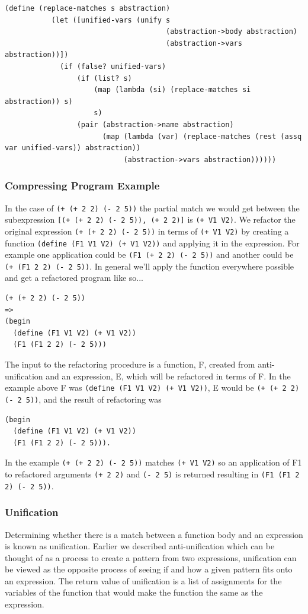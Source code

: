 \documentclass[a4paper,10pt]{article}
\begin{document}
\begin{lstlisting}[frame=trBL]
(define (replace-matches s abstraction)
           (let ([unified-vars (unify s
                                      (abstraction->body abstraction)
                                      (abstraction->vars abstraction))])
             (if (false? unified-vars)
                 (if (list? s)
                     (map (lambda (si) (replace-matches si abstraction)) s)
                     s)
                 (pair (abstraction->name abstraction)
                       (map (lambda (var) (replace-matches (rest (assq var unified-vars)) abstraction))
                            (abstraction->vars abstraction))))))
\end{lstlisting}
\subsubsection{Compressing Program Example}
In the case of \texttt{(+ (+ 2 2) (- 2 5))} the partial match we would get between the subexpression \texttt{[(+ (+ 2 2) (- 2 5)), (+ 2 2)]} is \texttt{(+ V1 V2)}.  We refactor the original expression \texttt{(+ (+ 2 2) (- 2 5))} in terms of \texttt{(+ V1 V2)} by creating a function \texttt{(define (F1 V1 V2) (+ V1 V2))} and applying it in the expression.  For example one application could be \texttt{(F1 (+ 2 2) (- 2 5))} and another could be \texttt{(+ (F1 2 2) (- 2 5))}.  In general we'll apply the function everywhere possible and get a refactored program like so...
\begin{lstlisting}
(+ (+ 2 2) (- 2 5))
=>
(begin
  (define (F1 V1 V2) (+ V1 V2))
  (F1 (F1 2 2) (- 2 5)))
\end{lstlisting}
The input to the refactoring procedure is a function, F, created from anti-unification and an expression, E, which will be refactored in terms of F.  In the example above F was \texttt{(define (F1 V1 V2) (+ V1 V2))}, E would be \texttt{(+ (+ 2 2) (- 2 5))}, and the result of refactoring was 
\begin{lstlisting}
(begin
  (define (F1 V1 V2) (+ V1 V2))
  (F1 (F1 2 2) (- 2 5))).
\end{lstlisting}

In the example \texttt{(+ (+ 2 2) (- 2 5))} matches \texttt{(+ V1 V2)} so an application of F1 to refactored arguments \texttt{(+ 2 2)} and \texttt{(- 2 5)} is returned resulting in \texttt{(F1 (F1 2 2) (- 2 5))}.  


\subsubsection{Unification}
Determining whether there is a match between a function body and an expression is known as unification.  Earlier we described anti-unification which can be thought of as a process to create a pattern from two expressions, unification can be viewed as the opposite process of seeing if and how a given pattern fits onto an expression.  The return value of unification is a list of assignments for the variables of the function that would make the function the same as the expression.
\end{document}
